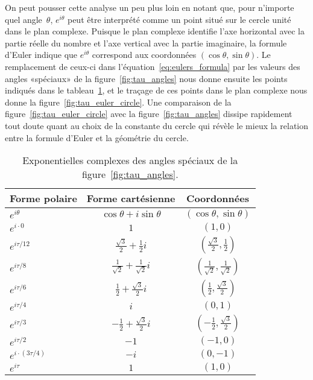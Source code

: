 On peut pousser cette analyse un peu plus loin en notant que, pour n'importe
quel angle~$\theta$, $e^{i\theta}$ peut être interprété comme un point situé sur
le cercle unité dans le plan complexe. Puisque le plan complexe identifie l'axe
horizontal avec la partie réelle du nombre et l'axe vertical avec la partie
imaginaire, la formule d'Euler indique que $e^{i\theta}$ correspond aux
coordonnées $(\cos\theta,\sin\theta)$. Le remplacement de ceux-ci dans
l'équation~\eqref{eq:eulers_formula} par les valeurs des angles «\ns spéciaux\ns »
de la figure~\ref{fig:tau_angles} nous donne ensuite les points indiqués dans le
tableau~\ref{table:complex_exponentials}, et le traçage de ces points dans le
plan complexe nous donne la figure~\ref{fig:tau_euler_circle}. Une comparaison de la
figure~\ref{fig:tau_euler_circle} avec la figure~\ref{fig:tau_angles} dissipe
rapidement tout doute quant au choix de la constante du cercle qui révèle le
mieux la relation entre la formule d'Euler et la géométrie du cercle.

\begin{table}
\begin{center}
\begin{tabular}{lcc}
Forme polaire & Forme cartésienne & Coordonnées \\ \hline\hline
$e^{i\theta}$ & $\cos\theta + i\sin\theta$ & $(\cos\theta, \sin\theta)$ \\ \hline
$e^{i\cdot0}$ & $1$ & $(1, 0)$ \smallskip \\
$e^{i\tau/12}$ & $\frac{\sqrt{3}}{2} + \frac{1}{2}i$ & $(\frac{\sqrt{3}}{2}, \frac{1}{2})$ \smallskip \\
$e^{i\tau/8}$ & $\frac{1}{\sqrt{2}} +  \frac{1}{\sqrt{2}}i$ & $(\frac{1}{\sqrt{2}}, \frac{1}{\sqrt{2}})$ \smallskip \\
$e^{i\tau/6}$ & $\frac{1}{2} +\frac{\sqrt{3}}{2} i$ & $(\frac{1}{2}, \frac{\sqrt{3}}{2})$ \smallskip \\
$e^{i\tau/4}$ & $i$ & $(0, 1)$ \smallskip \\
$e^{i\tau/3}$ & $-\frac{1}{2} +\frac{\sqrt{3}}{2} i$ & $(-\frac{1}{2}, \frac{\sqrt{3}}{2})$ \smallskip \\
$e^{i\tau/2}$ & $-1$ & $(-1, 0)$ \smallskip \\
$e^{i\cdot(3\tau/4)}$ & $-i$ & $(0, -1)$ \smallskip \\
$e^{i\tau}$ & $1$ & $(1, 0)$
\end{tabular}
\end{center}
\caption{Exponentielles complexes des angles spéciaux de la
figure~\ref{fig:tau_angles}.\label{table:complex_exponentials}}
\end{table}

